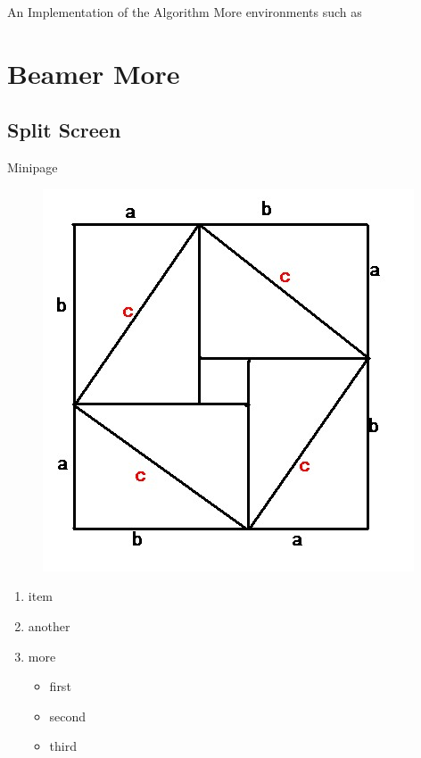 \begin{frame}{An Implementation of the Algorithm}
    More environments such as


\end{frame}

\section{Beamer More}

\subsection{Split Screen}

\begin{frame}{Minipage}
    \begin{minipage}{0.5\linewidth}
        \begin{figure}[h]
            \includegraphics[width=\textwidth]{imgs/pythagorean.jpg}
        \end{figure}
    \end{minipage}%
    \hfill
    \begin{minipage}{0.4\linewidth}
        \begin{enumerate}
            \item item
            \item another
            \item more
            \begin{itemize}
                \item first
                \item second
                \item third
            \end{itemize}
        \end{enumerate}
    \end{minipage}
\end{frame}

